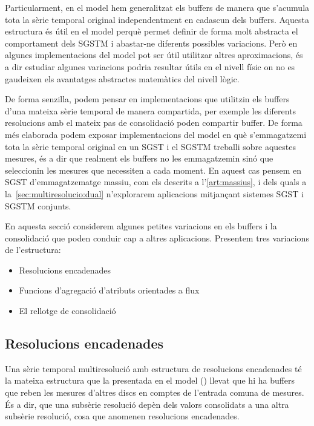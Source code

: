 Particularment, en el model hem generalitzat els buffers de manera que
s'acumula tota la sèrie temporal original independentment en cadascun
dels buffers. Aquesta estructura és útil en el model perquè permet
definir de forma molt abstracta el comportament dels \gls{SGSTM} i
abastar-ne diferents possibles variacions.  Però en algunes
implementacions del model pot ser útil utilitzar altres aproximacions,
és a dir estudiar algunes variacions podria resultar útils en el nivell físic
on no es gaudeixen els avantatges abstractes matemàtics del nivell
lògic.




De forma senzilla, podem pensar en implementacions que utilitzin els
buffers d'una mateixa sèrie temporal de manera compartida, per exemple
les diferents resolucions amb el mateix pas de consolidació poden
compartir buffer. De forma més elaborada podem exposar implementacions
del model en què s'emmagatzemi tota la sèrie temporal original en un
\gls{SGST} i el \gls{SGSTM} treballi sobre aquestes mesures, és a dir
que realment els buffers no les emmagatzemin sinó que seleccionin les
mesures que necessiten a cada moment. En aquest cas pensem en
\gls{SGST} d'emmagatzematge massiu, com els descrits a
l'\autoref{art:massius}, i dels quals a
la~\autoref{sec:multiresolucio:dual} n'explorarem aplicacions
mitjançant sistemes \gls{SGST} i \gls{SGSTM} conjunts.


En aquesta secció considerem algunes petites variacions en els buffers
i la consolidació que poden conduir cap a altres aplicacions.
Presentem tres variacions de l'estructura:
\begin{itemize}
\item Resolucions encadenades

\item Funcions d'agregació d'atributs orientades a flux

\item El rellotge de consolidació
\end{itemize}









\subsection{Resolucions encadenades}


Una sèrie temporal multiresolució amb estructura de resolucions
encadenades té la mateixa estructura que la presentada en el model
() llevat que hi ha buffers que
reben les mesures d'altres discs en comptes de l'entrada comuna de
mesures.  És a dir, que una subsèrie resolució depèn dels valors
consolidats a una altra subsèrie resolució, cosa que anomenen
resolucions encadenades.


